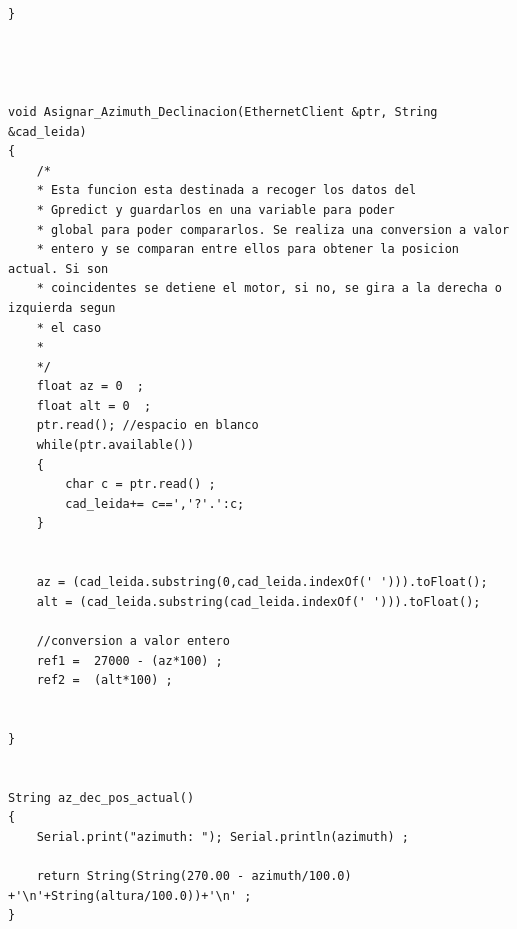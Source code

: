 \begin{appendices}
\begin{verbatim}
}




void Asignar_Azimuth_Declinacion(EthernetClient &ptr, String &cad_leida)
{
	/*
	* Esta funcion esta destinada a recoger los datos del 
	* Gpredict y guardarlos en una variable para poder 
	* global para poder compararlos. Se realiza una conversion a valor 
	* entero y se comparan entre ellos para obtener la posicion actual. Si son 
	* coincidentes se detiene el motor, si no, se gira a la derecha o izquierda segun 
	* el caso
	* 
	*/
	float az = 0  ;
	float alt = 0  ;
	ptr.read(); //espacio en blanco  
	while(ptr.available())
	{ 
		char c = ptr.read() ; 
		cad_leida+= c==','?'.':c;   
	}
	
	
	az = (cad_leida.substring(0,cad_leida.indexOf(' '))).toFloat();
	alt = (cad_leida.substring(cad_leida.indexOf(' '))).toFloat(); 
	
	//conversion a valor entero 
	ref1 =  27000 - (az*100) ; 
	ref2 =  (alt*100) ;  
	
	
}


String az_dec_pos_actual()
{
	Serial.print("azimuth: "); Serial.println(azimuth) ; 
	
	return String(String(270.00 - azimuth/100.0) +'\n'+String(altura/100.0))+'\n' ; 
}

		\end{verbatim}

	 
	
\end{appendices}
	